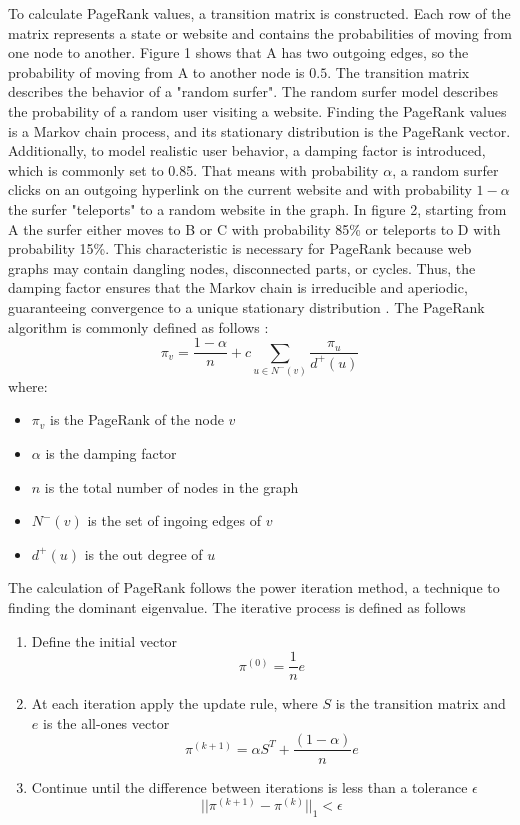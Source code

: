 To calculate PageRank values, a transition matrix is constructed. Each row of the matrix represents a state or website and contains the probabilities of moving from one node to another. Figure 1 shows that A has two outgoing edges, so the probability of moving from A to another node is $0.5$. The transition matrix describes the behavior of a "random surfer". The random surfer model describes the probability of a random user visiting a website. Finding the PageRank values is a Markov chain process, and its stationary distribution is the PageRank vector. Additionally, to model realistic user behavior, a damping factor is introduced, which is commonly set to 0.85. That means with probability $\alpha$, a random surfer clicks on an outgoing hyperlink on the current website and with probability $1-\alpha$ the surfer "teleports" to a random website in the graph. In figure 2, starting from A the surfer either moves to B or C with probability 85\% or teleports to D with probability 15\%. This characteristic is necessary for PageRank because web graphs may contain dangling nodes, disconnected parts, or cycles. Thus, the damping factor ensures that the Markov chain is irreducible and aperiodic, guaranteeing convergence to a unique stationary distribution \cite{langville_googles_2012}. 
The PageRank algorithm is commonly defined as follows \cite{chebolu_pagerank_2008}:
\begin{equation}
    \pi_v = \frac{1-\alpha}{n}+c\sum_{u\in N^-(v)}\frac{\pi_u}{d^+(u)} 
\end{equation} 
where: 
\begin{itemize}
    \item $\pi_v$ is the PageRank of the node $v$
    \item $\alpha$ is the damping factor
    \item $n$ is the total number of nodes in the graph
    \item $N^-(v)$ is the set of ingoing edges of $v$
    \item $d^+(u)$ is the out degree of $u$
\end{itemize} 
The calculation of PageRank follows the power iteration method, a technique to finding the dominant eigenvalue. The iterative process is defined as follows
\begin{enumerate}
    \item Define the initial vector 
    \begin{equation}
        \pi^{(0)}=\frac{1}{n}e
    \end{equation}
    \item At each iteration apply the update rule, where $S$ is the transition matrix and $e$ is the all-ones vector
    \begin{equation}
        \pi^{(k+1)} = \alpha S^T+ \frac{(1-\alpha)}{n}e
    \end{equation}
    \item Continue until the difference between iterations is less than a tolerance $\epsilon$
    \begin{equation}
        ||\pi^{(k+1)}-\pi^{(k)}||_1<\epsilon 
    \end{equation}
    
\end{enumerate}
